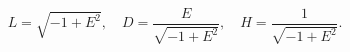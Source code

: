 \begin{equation}
L = \sqrt{-1+E^2}, \quad
D = \frac{E}{\sqrt{-1+E^2}}, \quad
H = \frac{1}{\sqrt{-1+E^2}}.
\end{equation}


